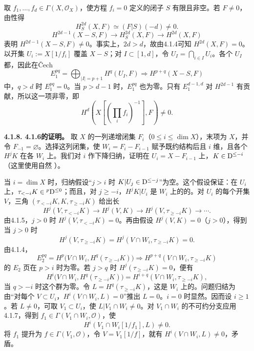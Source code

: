 取 $f_1,\ldots,f_d\in\Gamma(X,\mathcal O_X)$，使方程 $f_i=0$ 定义的闭子 $S$ 有限且非空。若 $F\ne0$，由性得
\[H_S^{2d}(X,F)\simeq(F|S)(-d)\ne0.\]
\[H^{2d-1}(X-S,F)\longrightarrow H_S^{2d}(X,F)\longrightarrow H^{2d}(X,F)\]
表明 $H^{2d-1}(X-S,F)\ne0$。事实上，$2d>d$，故由4.1.4可知 $H^{2d}(X,F)=0$。以开集 $U_i:=X[1/f_i]$ 覆盖 $X-S$；对 $I\subset[1,d]$，令 $U_I=\bigcap_{i\in I}U_i$。各个 $U_I$ 都，因此在Čech
\[E_1^{pq}=\bigoplus_{|I|=p+1}H^q(U_I,F)\Longrightarrow H^{p+q}(X-S,F)\]
中，$q>d$ 时 $E_1^{pq}=0$。当 $p>d-1$ 时，$E_1^{pq}$ 也为零。只有 $E_1^{d-1,d}$ 对 $H^{2d-1}$ 有贡献，所以这一项非零，即
\[H^d\!\left(X\left[\left(\prod_i f_i\right)^{-1}\right],F\right)\ne0.\]

\par\medskip\noindent\textbf{4.1.8. 4.1.6的证明。} 取 $X$ 的一列递增闭集 $F_i$（$0\le i\le\dim X$），末项为 $X$，并令 $F_{-1}=\varnothing$。选择这列闭集，使 $W_i=F_i-F_{i-1}$ 赋予既约结构后且 $i$ 维，且各个 $H^jK$ 在各 $W_i$ 上。我们对 $i$ 作下降归纳，证明在 $U_i=X-F_{i-1}$ 上，$K\in\mathrm{D}^{\le-i}$（这里使用自然 ）。

当 $i=\dim X$ 时，归纳假设“$j>i$ 时 $K|U_j\in\mathrm{D}^{\le-j}$”为空。这个假设保证：在 $U_i$ 上，$\tau_{<-i}K\in{}^p\mathrm{D}^{\le0}$；而且，对 $j\ge-i$，$H^jK|U_i$ 是 $W_i$ 上的的。对 $U_i$ 的每个开集 $V$，三角 $(\tau_{<-i}K,K,\tau_{\ge-i}K)$ 给出长
\[H^j(V,\tau_{<-i}K)\longrightarrow H^j(V,K)\longrightarrow H^j(V,\tau_{\ge-i}K)\longrightarrow\cdots.\]
由4.1.5，$j>0$ 时 $H^j(V,\tau_{<-i}K)=0$。再由假设 $H^j(V,K)=0$（$j>0$），得到当 $j>0$ 时
\[H^j(V,\tau_{\ge-i}K)=H^j(V\cap W_i,\tau_{\ge-i}K)=0.\]
由4.1.4，
\[E_2^{pq}=H^p\bigl(V\cap W_i,H^q(\tau_{\ge-i}K)\bigr)\Longrightarrow H^{p+q}(V\cap W_i,\tau_{\ge-i}K)\]
的 $E_2$ 页在 $p>i$ 时为零。若 $j>q$ 时 $H^j(\tau_{\ge-i}K)=0$，便有
\[H^i\bigl(V\cap W_i,H^q(\tau_{\ge-i}K)\bigr)=H^{i+q}(V\cap W_i,\tau_{\ge-i}K),\]
当 $q>-i$ 时这个群为零。令 $L=H^q(\tau_{\ge-i}K)$，这是 $W_i$ 上的。问题归结为由“对每个 $V\subset U_i$，$H^i(V\cap W_i,L)=0$”推出 $L=0$。$i=0$ 时显然。因而设 $i\ge1$。若 $L\ne0$，可取 $V_1\subset U_i$，使 $L|V_1\cap W_i\ne0$。对 $V_1\cap W_i$ 的不可约分支应用4.1.7，得到 $f_1\in\Gamma(V_1\cap W_i,\mathcal O)$，使
\[H^i(V_1\cap W_i[1/f_1],L)\ne0.\]
将 $f_1$ 提升为 $f\in\Gamma(V_1,\mathcal O)$，令 $V=V_1[1/f]$，就有 $H^i(V\cap W_i,L)\ne0$，矛盾。

